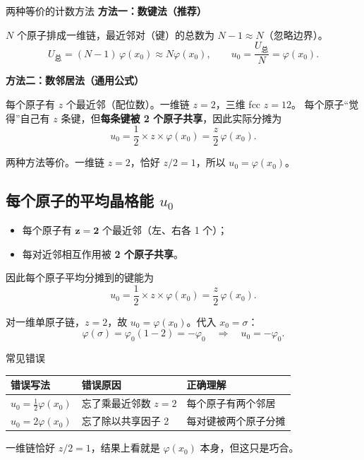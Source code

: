 \begin{modelbox}{两种等价的计数方法}
\textbf{方法一：数键法（推荐）}

$N$ 个原子排成一维链，最近邻对（键）的总数为 $N-1 \approx N$（忽略边界）。
\[
  U_{\text{总}} = (N-1)\,\varphi(x_0) \approx N\varphi(x_0), \qquad u_0 = \frac{U_{\text{总}}}{N} = \varphi(x_0).
\]

\textbf{方法二：数邻居法（通用公式）}

每个原子有 $z$ 个最近邻（配位数）。一维链 $z=2$，三维 fcc $z=12$。
每个原子``觉得''自己有 $z$ 条键，但\textbf{每条键被 2 个原子共享}，因此实际分摊为
\[
  u_0 = \frac{1}{2} \times z \times \varphi(x_0) = \frac{z}{2}\,\varphi(x_0).
\]

两种方法等价。一维链 $z=2$，恰好 $z/2=1$，所以 $u_0 = \varphi(x_0)$。
\end{modelbox}

\subsection{每个原子的平均晶格能 $u_0$}

\begin{modelbox}
\begin{itemize}[nosep]
  \item 每个原子有 $\bm{z=2}$ 个最近邻（左、右各 1 个）；
  \item 每对近邻相互作用被 \textbf{2 个原子共享}。
\end{itemize}
因此每个原子平均分摊到的键能为
\[
  u_0 = \frac{1}{2} \times z \times \varphi(x_0) = \frac{z}{2}\,\varphi(x_0).
\]
\end{modelbox}

对一维单原子链，$z=2$，故 $u_0 = \varphi(x_0)$。代入 $x_0 = \sigma$：
\[
  \varphi(\sigma) = \varphi_0(1 - 2) = -\varphi_0 \quad\Longrightarrow\quad \boxed{u_0 = -\varphi_0}.
\]

\begin{tipbox}{常见错误}
\begin{center}
\renewcommand{\arraystretch}{1.4}
\begin{tabular}{|l|l|l|}
\hline
\textbf{错误写法} & \textbf{错误原因} & \textbf{正确理解} \\
\hline
$u_0 = \frac{1}{2}\varphi(x_0)$ & 忘了乘最近邻数 $z=2$ & 每个原子有两个邻居 \\
$u_0 = 2\varphi(x_0)$ & 忘了除以共享因子 2 & 每对键被两个原子分摊 \\
\hline
\end{tabular}
\end{center}
一维链恰好 $z/2 = 1$，结果上看就是 $\varphi(x_0)$ 本身，但这只是巧合。
\end{tipbox}


